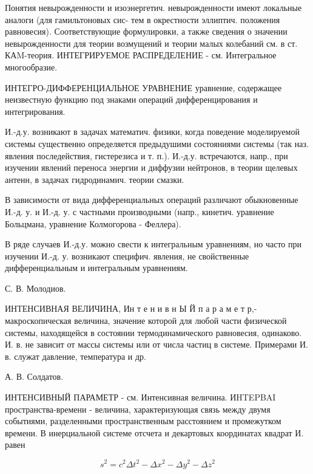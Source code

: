 \documentclass[10pt]{article}
\begin{document}
Понятия невырожденности и изоэнергетич. невырожденности имеют локальные аналоги (для гамильтоновых сис- тем в окрестности эллиптич. положения равновесия). Соответствующие формулировки, а также сведения о значении невырожденности для теории возмущений и теории малых колебаний см. в ст. КАM-теория. ИНТЕГРИРУЕМОЕ РАСПРЕДЕЛЕНИЕ - см. Интегральное многообразие.



ИНТЕГРО-ДИФФЕРЕНЦИАЛЬНОЕ УРАВНЕНИЕ уравнение, содержащее неизвестную функцию под знаками операций дифференцирования и интегрирования.



И.-д.у. возникают в задачах математич. физики, когда поведение моделируемой системы существенно определяется предыдушими состояниями системы (так наз. явления последействия, гистерезиса и т. п.). И.-д.у. встречаются, напр., при изучении явлений переноса энергии и диффузии нейтронов, в теории щелевых антенн, в задачах гидродинамич. теории смазки.



В зависимости от вида дифференциальных операций различают обыкновенные И.-д. у. и И.-д. у. с частными производными (напр., кинетич. уравнение Больцмана, уравнение Колмогорова - Феллера).



В ряде случаев И.-д.у. можно свести к интегральным уравнениям, но часто при изучении И.-д. у. возникают специфич. явления, не свойственные дифференциальным и интегральным уравнениям.



С. В. Молодиов.



ИНТЕНСИВНАЯ ВЕЛИЧИНА, Ин т е н и в н Ы Й п а р а м е т р,- макроскопическая величина, значение которой для любой части физической системы, находящейся в состоянии термодинамического равновесия, одинаково. И. в. не зависит от массы системы или от числа частиц в системе. Примерами И. в. служат давление, температура и др.



А. В. Солдатов.



ИНТЕНСИВНЫЙ ПАРАМЕТР - см. Интенсивная величина. ИHTEPBAI пространства-времени - величина, характеризующая связь между двумя событиями, разделенными пространственным расстоянием и промежутком времени. В инерциальной системе отсчета и декартовых координатах квадрат И. равен



\[

s^{2}=c^{2} \Delta t^{2}-\Delta x^{2}-\Delta y^{2}-\Delta z^{2}

\]
\end{document}

